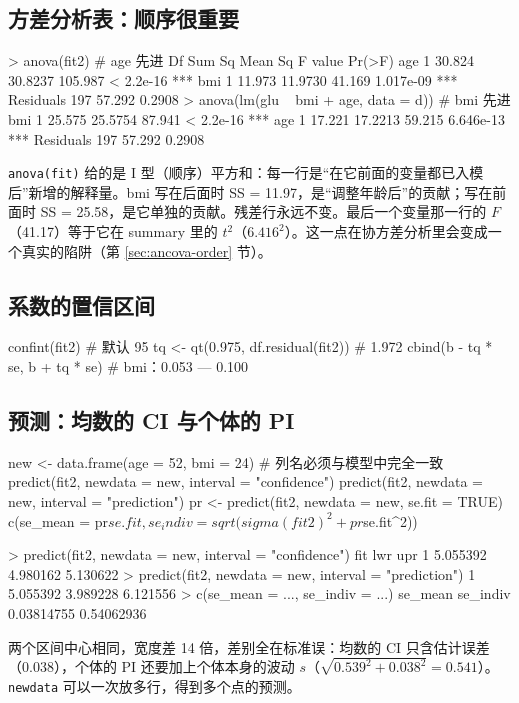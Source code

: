 \subsection{方差分析表：顺序很重要}
\begin{ROut}
> anova(fit2)                          # age 先进
           Df Sum Sq Mean Sq F value    Pr(>F)
age         1 30.824 30.8237 105.987 < 2.2e-16 ***
bmi         1 11.973 11.9730  41.169 1.017e-09 ***
Residuals 197 57.292  0.2908
> anova(lm(glu ~ bmi + age, data = d)) # bmi 先进
bmi         1 25.575 25.5754  87.941 < 2.2e-16 ***
age         1 17.221 17.2213  59.215 6.646e-13 ***
Residuals 197 57.292  0.2908
\end{ROut}
\Verb|anova(fit)| 给的是 I 型（顺序）平方和：每一行是“在它前面的变量都已入模后”新增的解释量。bmi 写在后面时 SS = 11.97，是“调整年龄后”的贡献；写在前面时 SS = 25.58，是它单独的贡献。残差行永远不变。最后一个变量那一行的 $F$（41.17）等于它在 summary 里的 $t^2$（$6.416^2$）。这一点在协方差分析里会变成一个真实的陷阱（第 \ref{sec:ancova-order} 节）。

\subsection{系数的置信区间}
\begin{RCode}
confint(fit2)                        # 默认 95%
tq <- qt(0.975, df.residual(fit2))   # 1.972
cbind(b - tq * se, b + tq * se)      # bmi：0.053 — 0.100
\end{RCode}

\subsection{预测：均数的 CI 与个体的 PI}
\begin{RCode}[R · predict]
new <- data.frame(age = 52, bmi = 24)     # 列名必须与模型中完全一致
predict(fit2, newdata = new, interval = "confidence")
predict(fit2, newdata = new, interval = "prediction")
pr <- predict(fit2, newdata = new, se.fit = TRUE)
c(se_mean = pr$se.fit, se_indiv = sqrt(sigma(fit2)^2 + pr$se.fit^2))
\end{RCode}
\begin{ROut}
> predict(fit2, newdata = new, interval = "confidence")
       fit      lwr      upr
1 5.055392 4.980162 5.130622
> predict(fit2, newdata = new, interval = "prediction")
1 5.055392 3.989228 6.121556
> c(se_mean = ..., se_indiv = ...)
   se_mean   se_indiv
0.03814755 0.54062936
\end{ROut}
两个区间中心相同，宽度差 14 倍，差别全在标准误：均数的 CI 只含估计误差（0.038），个体的 PI 还要加上个体本身的波动 $s$（$\sqrt{0.539^2+0.038^2}=0.541$）。\Verb|newdata| 可以一次放多行，得到多个点的预测。

